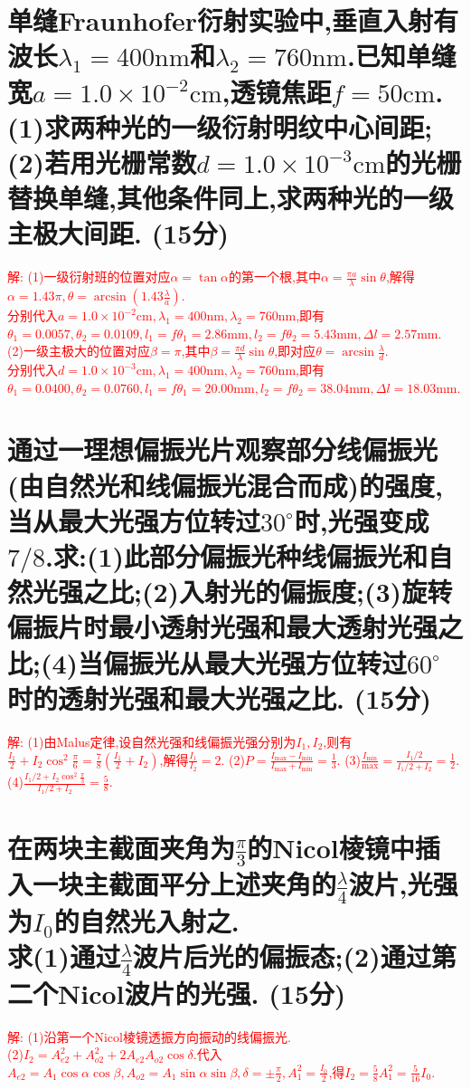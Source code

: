 \documentclass[UTF8]{article}
\newcommand{\cm}{\mathrm{cm}}
\newcommand{\mm}{\mathrm{mm}}
\newcommand{\nm}{\mathrm{nm}}
\newcommand\pts[1]{ \small{(#1分)}}
\begin{document}
    \section{单缝Fraunhofer衍射实验中,垂直入射有波长$\!\!\lambda_1=400\nm\!\!$和$\!\!\lambda_2=760\nm$.已知单缝宽$\!\!a=1.0\times 10^{-2}\cm$,透镜焦距$f=50\cm$.(1)求两种光的一级衍射明纹中心间距;(2)若用光栅常数$d=1.0\times 10^{-3}\cm$的光栅替换单缝,其他条件同上,求两种光的一级主极大间距.\pts{15}}
    \noindent \textcolor{red}{解: (1)一级衍射班的位置对应$\alpha=\tan \alpha$的第一个根,其中$\alpha=\frac{\pi a}{\lambda}\sin \theta$,解得$\alpha=1.43\pi, \theta=\arcsin(1.43\frac{\lambda}{a})$.\\ 分别代入$a=1.0\times 10^{-2}\cm,\lambda_1=400\nm,\lambda_2=760\nm$,即有$\theta_1=0.0057,\theta_2=0.0109,l_1=f\theta_1=2.86\mm,l_2=f\theta_2=5.43\mm,\Delta l=2.57\mm$.\\ (2)一级主极大的位置对应$\beta=\pi$,其中$\beta=\frac{\pi d}{\lambda}\sin \theta$,即对应$\theta=\arcsin \frac{\lambda}{d} $.\\ 分别代入$d=1.0\times 10^{-3}\cm,\lambda_1=400\nm,\lambda_2=760\nm$,即有$\theta_1=0.0400,\theta_2=0.0760,l_1=f\theta_1=20.00\mm,l_2=f\theta_2=38.04\mm,\Delta l=18.03\mm$.}

    \section{通过一理想偏振光片观察部分线偏振光(由自然光和线偏振光混合而成)的强度,当从最大光强方位转过$30^\circ$时,光强变成$7/8$.求:(1)此部分偏振光种线偏振光和自然光强之比;(2)入射光的偏振度;(3)旋转偏振片时最小透射光强和最大透射光强之比;(4)当偏振光从最大光强方位转过$60^\circ$时的透射光强和最大光强之比.\pts{15}}
    \noindent \textcolor{red}{解: (1)由Malus定律,设自然光强和线偏振光强分别为$I_1,I_2$,则有$\frac{I_1}{2}+I_2 \cos^2 \frac{\pi}{6}=\frac{7}{8}(\frac{I_1}{2}+I_2)$,解得$\frac{I_1}{I_2}=2$. (2)$P=\frac{I_{\mathrm{max}}-I_{\mathrm{min}}}{I_{\mathrm{max}}+I_{\mathrm{min}}}=\frac{1}{3}$. (3)$\frac{I_{\mathrm{min}}}{\mathrm{max}}=\frac{I_1/2}{I_1/2+I_2}=\frac{1}{2}$. (4)$\frac{I_1/2+I_2 \cos^2 \frac{\pi}{3}}{I_1/2+I_2}=\frac{5}{8}$.}

    \section{在两块主截面夹角为$\frac{\pi}{3}$的Nicol棱镜中插入一块主截面平分上述夹角的$\frac{\lambda}{4}$波片,光强为$I_0$的自然光入射之.\\ 求(1)通过$\frac{\lambda}{4}$波片后光的偏振态;(2)通过第二个Nicol波片的光强.\pts{15}}
    \noindent \textcolor{red}{解: (1)沿第一个Nicol棱镜透振方向振动的线偏振光.\\ (2)$I_2=A^2_{e2}+A^2_{o2}+2A_{e2}A_{o2}\cos \delta$.代入$\!A_{e2}\!=\!A_1\cos \alpha\cos \beta,A_{o2}=A_1\sin \alpha\sin \beta, \delta=\pm \frac{\pi}{2}, A_1^2=\frac{I_0}{2}$,得$I_2=\frac{5}{8}A_1^2=\frac{5}{16}I_0$.}
\end{document}
